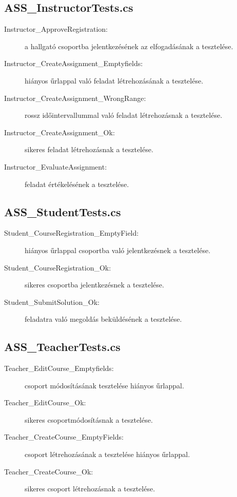 \subsection{ASS\_InstructorTests.cs}
\begin{description}
    \item[Instructor\_ApproveRegistration:] a hallgató csoportba jelentkezésének az elfogadásának a tesztelése.
    \item[Instructor\_CreateAssignment\_Emptyfields:] hiányos űrlappal való feladat létrehozásának a tesztelése.
    \item[Instructor\_CreateAssignment\_WrongRange:] rossz időintervallummal való feladat létrehozásnak a tesztelése.
    \item[Instructor\_CreateAssignment\_Ok:] sikeres feladat létrehozásnak a tesztelése.
    \item[Instructor\_EvaluateAssignment:] feladat értékelésének a tesztelése.
\end{description}
\subsection{ASS\_StudentTests.cs}
\begin{description}
    \item[Student\_CourseRegistration\_EmptyField:] hiányos űrlappal csoportba való jelentkezésnek a tesztelése.
    \item[Student\_CourseRegistration\_Ok:] sikeres csoportba jelentkezésnek a tesztelése.
    \item[Student\_SubmitSolution\_Ok:] feladatra való megoldás beküldésének a tesztelése.
\end{description}
\subsection{ASS\_TeacherTests.cs}
\begin{description}
    \item[Teacher\_EditCourse\_Emptyfields:] csoport módosításának tesztelése hiányos űrlappal.
    \item[Teacher\_EditCourse\_Ok:] sikeres csoportmódosításnak a tesztelése.
    \item[Teacher\_CreateCourse\_EmptyFields:] csoport létrehozásának a tesztelése hiányos űrlappal.
    \item[Teacher\_CreateCourse\_Ok:] sikeres csoport létrehozásnak a tesztelése.
\end{description}